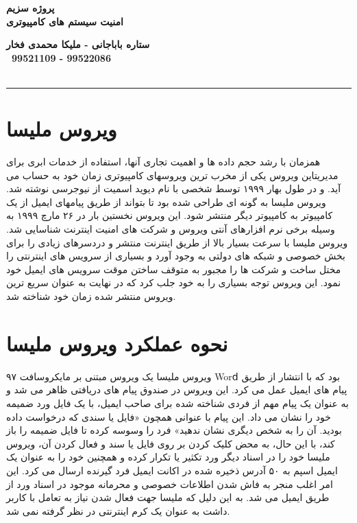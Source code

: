 \def \Subject {پروژه سزیم}
\def \Course {امنیت سیستم های کامپیوتری}
\def \Author {ستاره باباجانی - ملیکا محمدی فخار}
\def \StudentNumber {99521109 - 99522086}

\begin{center}
\vspace{.4cm}
{\bf {\huge \Subject}}\\
{\bf \Large \Course}
\vspace{.2cm}
\end{center}
{\bf \Author }  \\
{\bf \ \StudentNumber}\\\
\hrule

\clearpage



\section{ویروس ملیسا}
همزمان با رشد حجم داده ها و اهمیت تجاری آنها، استفاده از خدمات ابری برای مدیریتاین ویروس یکی
از مخرب ترین ویروسهای کامپیوتری زمان خود به حساب می آید. و در طول بهار ۱۹۹۹ توسط شخصی
با نام دیوید اسمیت از نیوجرسی نوشته شد. ویروس ملیسا به گونه ای طراحی شده بود تا بتواند از طریق
پیامهای ایمیل از یک کامپیوتر به کامپیوتر دیگر منتشر شود. این ویروس نخستین بار در ۲۶ مارچ ۱۹۹۹
به وسیله برخی نرم افزارهای آنتی ویروس و شرکت های امنیت اینترنت شناسایی شد. ویروس ملیسا
با سرعت بسیار بالا از طریق اینترنت منتشر و دردسرهای زیادی را برای بخش خصوصی و شبکه های
دولتی به وجود آورد و بسیاری از سرویس های اینترنتی را مختل ساخت و شرکت ها را مجبور به متوقف
ساختن موقت سرویس های ایمیل خود نمود. این ویروس توجه بسیاری را به خود جلب کرد که در نهایت
به عنوان سریع ترین ویروس منتشر شده زمان خود شناخته شد.

\section{نحوه عملکرد ویروس ملیسا}
ویروس ملیسا یک ویروس مبتنی بر مایکروسافت ۹۷ Worⅾ بود که با انتشار از طریق پیام های ایمیل
عمل می کرد. این ویروس در صندوق پیام های دریافتی ظاهر می شد و به عنوان یک پیام مهم از فردی
شناخته شده برای صاحب ایمیل، با یک فایل ورد ضمیمه خود را نشان می داد. این پیام با عنوانی همچون
«فایل یا سندی که درخواست داده بودید. آن را به شخص دیگری نشان ندهید» فرد را وسوسه کرده تا
فایل ضمیمه را باز کند، با این حال، به محض کلیک کردن بر روی فایل یا سند و فعال کردن آن، ویروس
ملیسا خود را در اسناد دیگر ورد تکثیر یا تکرار کرده و همچنین خود را به عنوان یک ایمیل اسپم به ۵۰
آدرس ذخیره شده در اکانت ایمیل فرد گیرنده ارسال می کرد. این امر اغلب منجر به فاش شدن اطلاعات
خصوصی و محرمانه موجود در اسناد ورد از طریق ایمیل می شد. به این دلیل که ملیسا جهت فعال شدن
نیاز به تعامل با کاربر داشت به عنوان یک کرم اینترنتی در نظر گرفته نمی شد.

